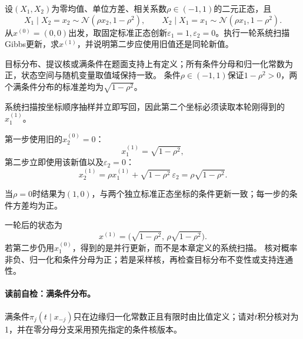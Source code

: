 \begin{example}\label{exm:V5-C04-bridge-bvn}
设$(X_1,X_2)$为零均值、单位方差、相关系数$\rho\in(-1,1)$的二元正态，且
\[
X_1\mid X_2=x_2\sim\mathcal N(\rho x_2,1-\rho^2),
\qquad
X_2\mid X_1=x_1\sim\mathcal N(\rho x_1,1-\rho^2).
\]
从$x^{(0)}=(0,0)$出发，取固定标准正态创新$\varepsilon_1=1,\varepsilon_2=0$。执行一轮系统扫描Gibbs更新，求$x^{(1)}$，并说明第二步应使用旧值还是同轮新值。
\end{example}
\begin{solution}
\SolGiven 目标分布、提议核或满条件在题面支持上有定义；所有条件分母和归一化常数为正，状态空间与随机变量取值域保持一致。
\SolDerive
\SolGiven 条件$\rho\in(-1,1)$保证$1-\rho^2>0$，两个满条件分布的标准差均为$\sqrt{1-\rho^2}$。

\SolPlan 系统扫描按坐标顺序抽样并立即写回，因此第二个坐标必须读取本轮刚得到的$x_1^{(1)}$。

\SolDerive 第一步使用旧的$x_2^{(0)}=0$：
\[
x_1^{(1)}=\sqrt{1-\rho^2},
\]
第二步立即使用该新值以及$\varepsilon_2=0$：
\[
x_2^{(1)}
=\rho x_1^{(1)}+\sqrt{1-\rho^2}\,\varepsilon_2
=\rho\sqrt{1-\rho^2}.
\]

\SolCheck 当$\rho=0$时结果为$(1,0)$，与两个独立标准正态坐标的条件更新一致；每一步的条件方差均为正。

\SolAnswer 一轮后的状态为
\[
x^{(1)}=\bigl(\sqrt{1-\rho^2},\,\rho\sqrt{1-\rho^2}\bigr).
\]
若第二步仍用$x_1^{(0)}$，得到的是并行更新，而不是本章定义的系统扫描。
\SolCheck 核对概率非负、归一化和条件分母为正；若是采样核，再检查目标分布不变性或支持连通性。
\end{solution}

\label{struct:V5-C04-CH07}
\paragraph{读前自检：满条件分布。}满条件$\pi_j(t\mid x_{-j})$只在边缘归一化常数正且有限时由比值定义；请对$t$积分核对为1，并在零分母分支采用预先指定的条件核版本。\par

